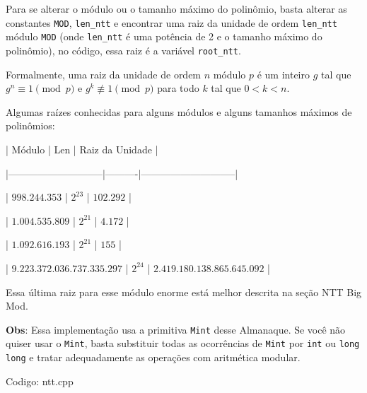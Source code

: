 \documentclass[10pt, a4paper, oneside]{book}
\begin{document}
Para se alterar o módulo ou o tamanho máximo do polinômio, basta alterar as constantes \texttt{MOD}, \texttt{len\_ntt} e encontrar uma raiz da unidade de ordem \texttt{len\_ntt} módulo \texttt{MOD} (onde \texttt{len\_ntt} é uma potência de 2 e o tamanho máximo do polinômio), no código, essa raiz é a variável \texttt{root\_ntt}.



Formalmente, uma raiz da unidade de ordem $n$ módulo $p$ é um inteiro $g$ tal que $g^n \equiv 1 \pmod{p}$ e $g^k \not\equiv 1 \pmod{p}$ para todo $k$ tal que $0 < k < n$.



Algumas raízes conhecidas para alguns módulos e alguns tamanhos máximos de polinômios:



|           Módulo            |   Len    |       Raiz da Unidade       |

|-----------------------------|----------|-----------------------------|

|        $998.244.353$        | $2^{23}$ |          $102.292$          |

|       $1.004.535.809$       | $2^{21}$ |           $4.172$           |

|       $1.092.616.193$       | $2^{21}$ |            $155$            |

| $9.223.372.036.737.335.297$ | $2^{24}$ | $2.419.180.138.865.645.092$ |



Essa última raiz para esse módulo enorme está melhor descrita na seção NTT Big Mod.



\textbf{Obs}: Essa implementação usa a primitiva \texttt{Mint} desse Almanaque. Se você não quiser usar o \texttt{Mint}, basta substituir todas as ocorrências de \texttt{Mint} por \texttt{int} ou \texttt{long long} e tratar adequadamente as operações com aritmética modular.
\hfill

Codigo: ntt.cpp
\end{document}
